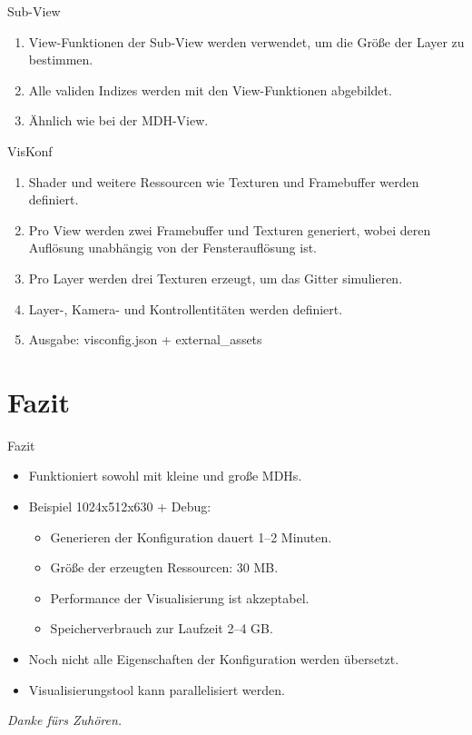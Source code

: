 \documentclass{presentation}
\begin{document}
\begin{frame}{Sub-View}
    \begin{enumerate}
        \item View-Funktionen der Sub-View werden verwendet,
                um die Größe der Layer zu bestimmen.
        \item Alle validen Indizes werden mit den View-Funktionen abgebildet.
        \item Ähnlich wie bei der MDH-View.
    \end{enumerate}
\end{frame}

\begin{frame}{VisKonf}
    \begin{enumerate}
        \item Shader und weitere Ressourcen wie Texturen und Framebuffer werden definiert.
        \item Pro View werden zwei Framebuffer und Texturen generiert, 
                wobei deren Auflösung unabhängig von der Fensterauflösung ist.
        \item Pro Layer werden drei Texturen erzeugt, um das Gitter simulieren.
        \item Layer-, Kamera- und Kontrollentitäten werden definiert.
        \item Ausgabe: visconfig.json + external\_assets
    \end{enumerate}
\end{frame}

\section{Fazit}

\begin{frame}{Fazit}
    \begin{itemize}
        \item Funktioniert sowohl mit kleine und große MDHs.
        \item Beispiel 1024x512x630 + Debug:
        \begin{itemize}
            \item Generieren der Konfiguration dauert 1–2 Minuten.
            \item Größe der erzeugten Ressourcen: 30 MB.
            \item Performance der Visualisierung ist akzeptabel.
            \item Speicherverbrauch zur Laufzeit 2–4 GB.
        \end{itemize}
        \item Noch nicht alle Eigenschaften der Konfiguration werden übersetzt.
        \item Visualisierungstool kann parallelisiert werden.
    \end{itemize}
\end{frame}

\begin{frame}
    \centering \Huge
    \emph{Danke fürs Zuhören.}
\end{frame}
\end{document}
